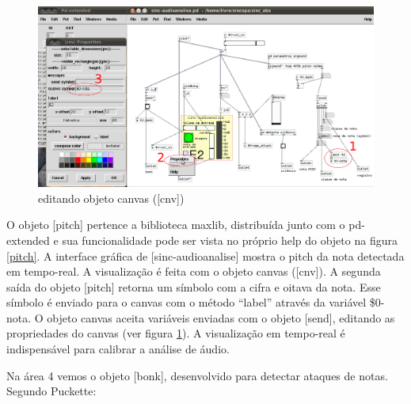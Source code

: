 \documentclass{ppgmus}
\begin{document}
\begin{figure}
\includegraphics[scale=.5]{canvas-edit}
\caption{editando objeto canvas ([cnv])}
\label{canvas-edit}
\end{figure}


O objeto [pitch] pertence a biblioteca maxlib, distribuída junto com o 
pd-extended e sua funcionalidade pode ser vista no próprio help do objeto na 
figura \ref{pitch}. A interface gráfica de [sinc-audioanalise] mostra o pitch
da nota detectada em tempo-real. A visualização é feita com o objeto canvas ([cnv]).
A segunda saída do objeto [pitch] retorna um símbolo com a cifra e oitava
da nota. Esse símbolo é enviado para o canvas com o método ``label'' através
da variável \$0-nota. O objeto canvas aceita variáveis enviadas com o objeto [send],
editando as propriedades do canvas (ver figura \ref{canvas-edit}). A visualização em tempo-real
é indispensável para calibrar a análise de áudio.




Na área 4 vemos o objeto [bonk\texttildelow], desenvolvido para
detectar ataques de notas. Segundo Puckette:
\end{document}

